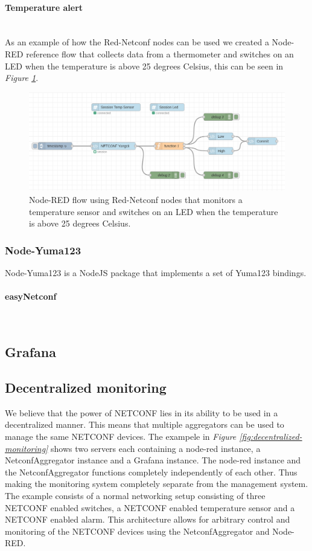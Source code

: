 \documentclass[12pt]{article}
\newcommand{\subsubsubsection}[1]{\paragraph{#1}\mbox{}\\}
\begin{document}
\subsubsubsection{Temperature alert}
As an example of how the Red-Netconf nodes can be used we created
a Node-RED reference flow that collects data from a thermometer and switches on an LED
when the temperature is above 25 degrees Celsius, this can be seen in \textit{Figure \ref{fig:red-netconf}}.

\newpage

\begin{figure}
  \centering
  \includegraphics[width=\textwidth]{red-netconf.png}
  \caption{Node-RED flow using Red-Netconf nodes that monitors a temperature sensor and 
  switches on an LED when the temperature is above 25 degrees Celsius.}
  \label{fig:red-netconf}
\end{figure}


\subsubsection{Node-Yuma123}
Node-Yuma123 \cite{Nodeyuma1232025} is a NodeJS package that implements a set of Yuma123 bindings.


\subsubsubsection{easyNetconf}

\subsection{Grafana}

\subsection{Decentralized monitoring}
We believe that the power of NETCONF lies in its ability to be used in a decentralized manner.
This means that multiple aggregators can be used to manage the same NETCONF devices. 
The exampele in \textit{Figure \ref{fig:decentralized-monitoring}} shows two servers each containing a node-red instance, a NetconfAggregator 
instance and a Grafana instance. The node-red instance and the NetconfAggregator functions completely independently of each other.
Thus making the monitoring system completely separate from the management system. The example consists of a normal networking setup
consisting of three NETCONF enabled switches, a NETCONF enabled temperature sensor and a NETCONF enabled alarm.
This architecture allows for arbitrary control and monitoring of the NETCONF devices using the NetconfAggregator and Node-RED.
\end{document}
